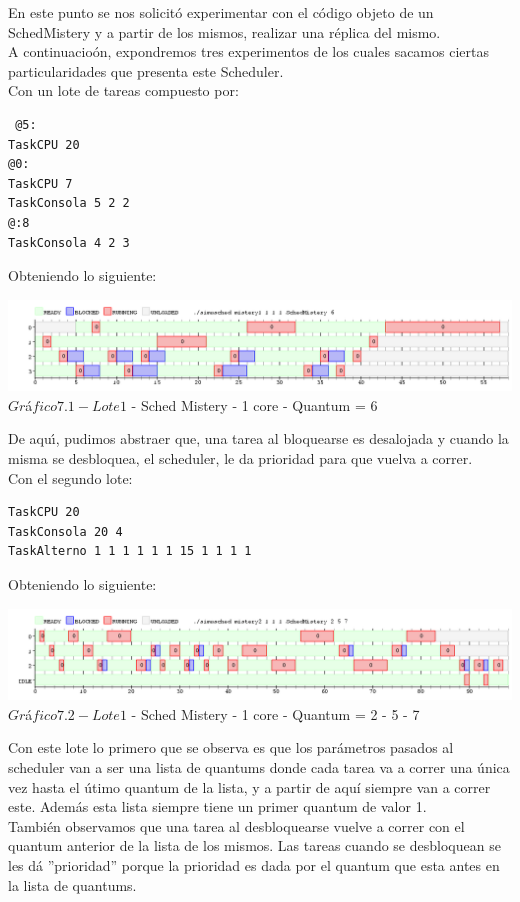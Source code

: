 \indent En este punto se nos solicit\'{o} experimentar con el c\'{o}digo objeto de un 
SchedMistery y a partir de los mismos, realizar una r\'{e}plica del mismo.\\

A continuacio\'{o}n, expondremos tres experimentos de los cuales sacamos ciertas particularidades que presenta este Scheduler.\\

Con un lote de tareas compuesto por:\\

\begin{verbatim}
 @5:
TaskCPU 20
@0:
TaskCPU 7
TaskConsola 5 2 2
@:8
TaskConsola 4 2 3
\end{verbatim}

Obteniendo lo siguiente:
\begin{center}
    	\includegraphics[width=450pt]{./Test/ej7_1.png}
	{$Gr$\'a$fico 7.1 - Lote 1$ - Sched Mistery - 1 core - Quantum = 6}	
 \end{center}
 
De aqu\'{\i}, pudimos abstraer que, una tarea al bloquearse es desalojada y cuando la misma se desbloquea, el scheduler, le da 
prioridad para que vuelva a correr.\\

Con el segundo lote:\\

\begin{verbatim}
TaskCPU 20
TaskConsola 20 4
TaskAlterno 1 1 1 1 1 1 15 1 1 1 1
\end{verbatim}

Obteniendo lo siguiente:
\begin{center}
    	\includegraphics[width=450pt]{./Test/ej7_2.png}
	{$Gr$\'a$fico 7.2 - Lote 1$ - Sched Mistery - 1 core - Quantum = 2 - 5 - 7}	
 \end{center}

Con este lote lo primero que se observa es que los par\'{a}metros pasados al scheduler van a ser una lista de quantums 
donde cada tarea va a correr una \'{u}nica vez hasta el \'{u}timo quantum de la lista, y a partir de aquí siempre van a correr este. Adem\'{a}s esta lista siempre 
tiene un primer quantum de valor 1.\\
Tambi\'{e}n observamos que una tarea al desbloquearse vuelve a correr con el quantum anterior de la lista de los mismos. 
Las tareas cuando se desbloquean se les d\'{a} ''prioridad'' porque la prioridad es dada por el quantum que esta antes en 
la lista de quantums.\\

